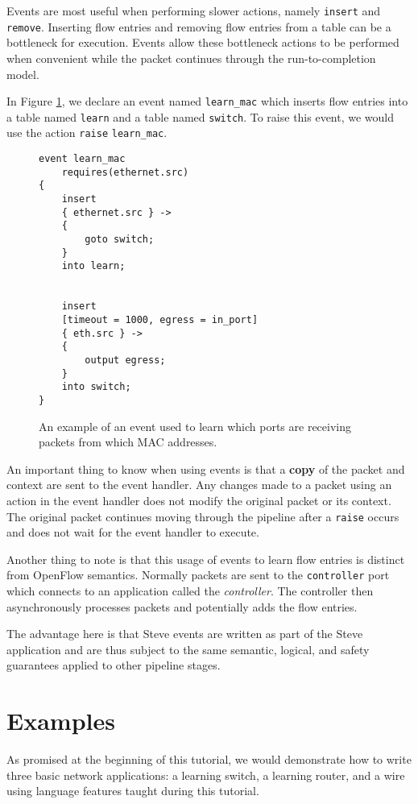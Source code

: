 Events are most useful when performing slower actions, namely \texttt{insert} and \texttt{remove}. Inserting flow entries and removing flow entries from a table can be a bottleneck for execution. Events allow these bottleneck actions to be performed when convenient while the packet continues through the run-to-completion model.

In Figure \ref{fg:event_ex}, we declare an event named \texttt{learn\_mac} which inserts flow entries into a table named \texttt{learn} and a table named \texttt{switch}. To raise this event, we would use the action \texttt{\color{blue}raise} \texttt{learn\_mac}. 

\begin{figure}[ht]
\begin{lstlisting}
event learn_mac
	requires(ethernet.src)
{
	insert
	{ ethernet.src } ->
	{
		goto switch;
	}
	into learn;


	insert
	[timeout = 1000, egress = in_port]
	{ eth.src } ->
	{
		output egress;
	}
	into switch;
}
\end{lstlisting}
\caption{An example of an event used to learn which ports are receiving packets from which MAC addresses.}
\label{fg:event_ex}
\end{figure}

An important thing to know when using events is that a \textbf{copy} of the packet and context are sent to the event handler. Any changes made to a packet using an action in the event handler does not modify the original packet or its context. The original packet continues moving through the pipeline after a \texttt{raise} occurs and does not wait for the event handler to execute.

Another thing to note is that this usage of events to learn flow entries is distinct from OpenFlow semantics. Normally packets are sent to the \texttt{controller} port which connects to an application called the \textit{controller}. The controller then asynchronously processes packets and potentially adds the flow entries.

The advantage here is that Steve events are written as part of the Steve application and are thus subject to the same semantic, logical, and safety guarantees applied to other pipeline stages. 

\section{Examples} \label{examples_tut}

As promised at the beginning of this tutorial, we would demonstrate how to write three basic network applications: a learning switch, a learning router, and a wire using language features taught during this tutorial.

